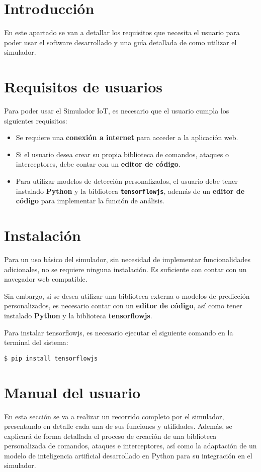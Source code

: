 
\section{Introducción}
\label{sec:UsuarioIntroduccion}
En este apartado se van a detallar los requisitos que necesita el usuario para poder usar el software desarrollado y una guía detallada de como utilizar el simulador.

\section{Requisitos de usuarios}
\label{sec:RequisitosUsuario}
Para poder usar el Simulador IoT, es necesario que el usuario cumpla los siguientes requisitos:
\begin{itemize}
    \item Se requiere una \textbf{conexión a internet} para acceder a la aplicación web.
    \item Si el usuario desea crear su propia biblioteca de comandos, ataques o interceptores, debe contar con un \textbf{editor de código}.
    \item Para utilizar modelos de detección personalizados, el usuario debe tener instalado \textbf{Python} y la biblioteca \textbf{\texttt{tensorflowjs}}, además de un \textbf{editor de código} para implementar la función de análisis.
\end{itemize}

\section{Instalación}
\label{sec:InstalacionUsuario}
Para un uso básico del simulador, sin necesidad de implementar funcionalidades adicionales, no se requiere ninguna instalación. Es suficiente con contar con un navegador web compatible.

Sin embargo, si se desea utilizar una biblioteca externa o modelos de predicción personalizados, es necesario contar con un \textbf{editor de código}, así como tener instalado \textbf{Python} y la biblioteca \textbf{tensorflowjs}.

Para instalar tensorflowjs, es necesario ejecutar el siguiente comando en la terminal del sistema:
\begin{verbatim}
$ pip install tensorflowjs
\end{verbatim}

\section{Manual del usuario}
\label{sec:ManualUsuario}
En esta sección se va a realizar un recorrido completo por el simulador, presentando en detalle cada una de sus funciones y utilidades. Además, se explicará de forma detallada el proceso de creación de una biblioteca personalizada de comandos, ataques e interceptores, así como la adaptación de un modelo de inteligencia artificial desarrollado en Python para su integración en el simulador.

